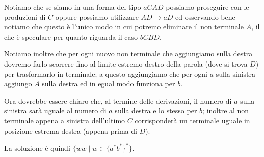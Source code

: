 \documentclass[class=book, crop=false, oneside, 12pt]{standalone}
\begin{document}
Notiamo che se siamo in una forma del tipo \(aCAD\) possiamo proseguire con le produzioni di \(C\) oppure possiamo utilizzare \(AD \to aD\) ed osservando bene notiamo che questo è l'unico modo in cui potremo eliminare il non terminale \(A\), il che è speculare per quanto riguarda il caso \(bCBD\).

Notiamo inoltre che per ogni nuovo non terminale che aggiungiamo sulla destra dovremo farlo scorrere fino al limite estremo destro della parola (dove si trova \(D\)) per trasformarlo in terminale; a questo aggiungiamo che per ogni \(a\) sulla sinistra aggiungo \(A\) sulla destra ed in egual modo funziona per \(b\).

Ora dovrebbe essere chiaro che, al termine delle derivazioni, il numero di \(a\) sulla sinistra  sarà uguale al numero di \(a\) sulla destra e lo stesso per \(b\); inoltre al non terminale appena a sinistra dell'ultimo \(C\) corrisponderà un terminale uguale in posizione estrema destra (appena prima di \(D\)).

La soluzione è quindi \(\{ ww \mid w \in \{a^* b^*\}^*\}\).
\end{document}
